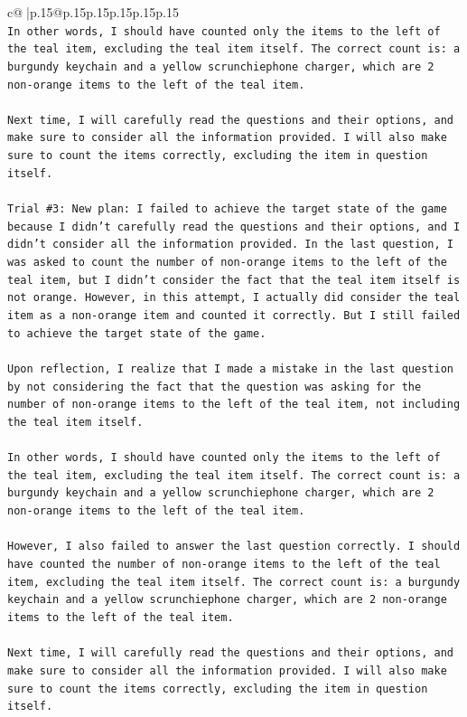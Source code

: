 \documentclass{article}
\begin{document}
{\begin{supertabular}{c@{$\;$}|p{.15\linewidth}@{}p{.15\linewidth}p{.15\linewidth}p{.15\linewidth}p{.15\linewidth}p{.15\linewidth}}
{{{\\ 
\texttt{In other words, I should have counted only the items to the left of the teal item, excluding the teal item itself. The correct count is: a burgundy keychain and a yellow scrunchiephone charger, which are 2 non{-}orange items to the left of the teal item. } \\
\\ 
\texttt{Next time, I will carefully read the questions and their options, and make sure to consider all the information provided. I will also make sure to count the items correctly, excluding the item in question itself.} \\
\\ 
\texttt{Trial \#3: New plan: I failed to achieve the target state of the game because I didn't carefully read the questions and their options, and I didn't consider all the information provided. In the last question, I was asked to count the number of non{-}orange items to the left of the teal item, but I didn't consider the fact that the teal item itself is not orange. However, in this attempt, I actually did consider the teal item as a non{-}orange item and counted it correctly. But I still failed to achieve the target state of the game. } \\
\\ 
\texttt{Upon reflection, I realize that I made a mistake in the last question by not considering the fact that the question was asking for the number of non{-}orange items to the left of the teal item, not including the teal item itself. } \\
\\ 
\texttt{In other words, I should have counted only the items to the left of the teal item, excluding the teal item itself. The correct count is: a burgundy keychain and a yellow scrunchiephone charger, which are 2 non{-}orange items to the left of the teal item. } \\
\\ 
\texttt{However, I also failed to answer the last question correctly. I should have counted the number of non{-}orange items to the left of the teal item, excluding the teal item itself. The correct count is: a burgundy keychain and a yellow scrunchiephone charger, which are 2 non{-}orange items to the left of the teal item. } \\
\\ 
\texttt{Next time, I will carefully read the questions and their options, and make sure to consider all the information provided. I will also make sure to count the items correctly, excluding the item in question itself.} \\
}}}
\end{supertabular}}
\end{document}
